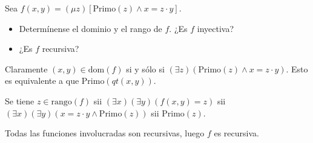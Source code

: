 \documentclass[twoside]{article}
\begin{document}
\newpage
\begin{ejercicio}{24}
Sea $f(x,y) = (μz)[\text{Primo}(z) \land x = z \cdot y]$.
\begin{itemize}
	\item Determínense el dominio y el rango de $f$. ¿Es $f$ inyectiva?
	\item ¿Es $f$ recursiva?
\end{itemize}
\end{ejercicio}
\begin{solucion}
Claramente $(x,y) \in \text{dom}(f)$ si y sólo si $(\exists z)(\text{Primo}(z) \land x = z\cdot y)$. Esto es equivalente a que $\text{Primo}(qt(x,y))$.

Se tiene $z \in \text{rango}(f)$ sii $(\exists x)(\exists y) (f(x,y)=z)$ sii $(\exists x)(\exists y) (x=z\cdot y \land \text{Primo}(z))$ sii $\text{Primo}(z)$.

Todas las funciones involucradas son recursivas, luego $f$ es recursiva.
\end{solucion}
\end{document}
